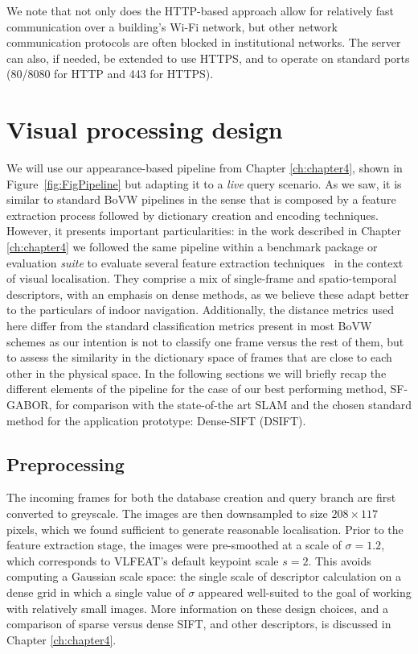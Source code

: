 We note that not only does the HTTP-based approach allow for relatively fast communication over a building's Wi-Fi network, but other network communication protocols are often blocked in institutional networks. The server can also, if needed, be extended to use HTTPS, and to operate on standard ports (80/8080 for HTTP and 443 for HTTPS).

\section{Visual processing design}
\label{sec:visualproc}
We will use our appearance-based pipeline from Chapter \ref{ch:chapter4}, shown in Figure~\ref{fig:FigPipeline} but adapting it to a \emph{live} query scenario. As we saw, it is similar to standard BoVW pipelines in the sense that is composed by a feature extraction process followed by dictionary creation and encoding techniques. However, it presents important particularities: in the work described in Chapter \ref{ch:chapter4} we followed the same pipeline within a benchmark package or evaluation \emph{suite} to evaluate several feature extraction techniques~\citep{Rivera-Rubio2015PRL} in the context of visual localisation. They comprise a mix of single-frame and spatio-temporal descriptors, with an emphasis on dense methods, as we believe these adapt better to the particulars of indoor navigation. Additionally, the distance metrics used here differ from the standard classification metrics present in most BoVW schemes as our intention is not to classify one frame versus the rest of them, but to assess the similarity in the dictionary space of frames that are close to each other in the physical space. In the following sections we will briefly recap the different elements of the pipeline for the case of our best performing method, SF-GABOR, for comparison with the state-of-the art SLAM and the chosen standard method for the application prototype: Dense-SIFT (DSIFT).

\subsection{Preprocessing}

The incoming frames for both the database creation and query branch are first converted to greyscale. The images are then downsampled to size $208 \times 117$ pixels, which we found sufficient to generate reasonable localisation. Prior to the feature extraction stage, the images were pre-smoothed at a scale of $\sigma = 1.2$, which corresponds to VLFEAT's default keypoint scale $s = 2$. This avoids computing a Gaussian scale space: the single scale of descriptor calculation on a dense grid in which a single value of $\sigma$ appeared well-suited to the goal of working with relatively small images. More information on these design choices, and a comparison of sparse versus dense SIFT, and other descriptors, is discussed in Chapter \ref{ch:chapter4}.

